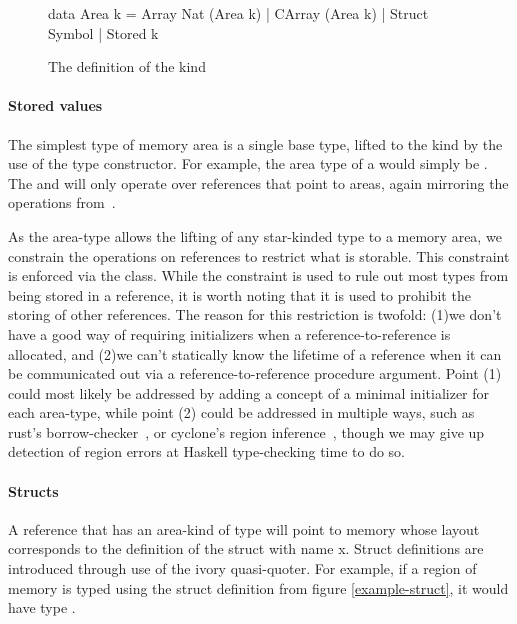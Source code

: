 \begin{figure}[h]
\begin{code}
data Area k = Array Nat (Area k)
            | CArray (Area k)
            | Struct Symbol
            | Stored k
\end{code}
\caption{The definition of the  kind}
\label{fig:area-def}
\end{figure}

\paragraph{Stored values}
The simplest type of memory area is a single base type, lifted to the 
kind by the use of the  type constructor.  For example, the area type
of a  would simply be .  The  and
 will only operate over references that point to  areas,
again mirroring the operations from~\cite{memareas}.

As the  area-type allows the lifting of any star-kinded type to a
memory area, we constrain the operations on references to restrict what is
storable.  This constraint is enforced via the  class.  While the
 constraint is used to rule out most types from being stored in a
reference, it is worth noting that it is used to prohibit the storing of other
references.  The reason for this restriction is twofold: (1)we don't have a good
way of requiring initializers when a reference-to-reference is allocated, and
(2)we can't statically know the lifetime of a reference when it can be
communicated out via a reference-to-reference procedure argument.  Point (1)
could most likely be addressed by adding a concept of a minimal initializer for
each area-type, while point (2) could be addressed in multiple ways, such as
rust's borrow-checker~\cite{rust}, or cyclone's region inference~\cite{cyclone},
though we may give up detection of region errors at Haskell type-checking time
to do so.

\paragraph{Structs} A reference that has an area-kind of type 
will point to memory whose layout corresponds to the definition of the struct
with name x.  Struct definitions are introduced through use of the ivory
quasi-quoter.  For example, if a region of memory is typed using the struct
definition from figure \ref{example-struct}, it would have type .

